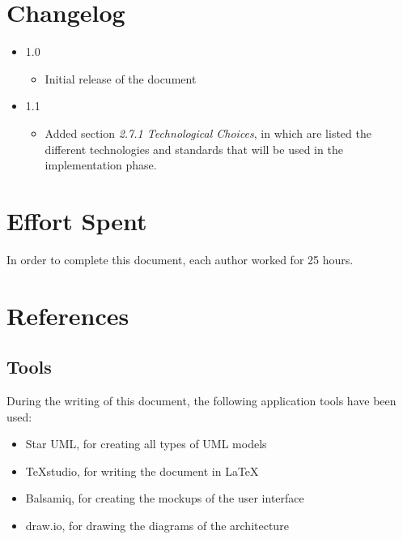 \documentclass[11pt,a4paper]{report}
\begin{document}
\chapter{Changelog}
\begin{itemize}
	\item 1.0
	\begin{itemize}
		\item Initial release of the document
	\end{itemize}
	\item 1.1
		\begin{itemize}
			\item Added section \textit{2.7.1 Technological Choices}, in which are listed the different technologies and standards that will be used in the implementation phase.
		\end{itemize}
\end{itemize}
\chapter{Effort Spent}
In order to complete this document, each author worked for 25 hours.
\chapter{References}
\section{Tools}
During the writing of this document, the following application tools have been used:
\begin{itemize}
	\item Star UML, for creating all types of UML models
	\item TeXstudio, for writing the document in \LaTeX
	\item Balsamiq, for creating the mockups of the user interface
	\item draw.io, for drawing the diagrams of the architecture
\end{itemize}
\end{document}
